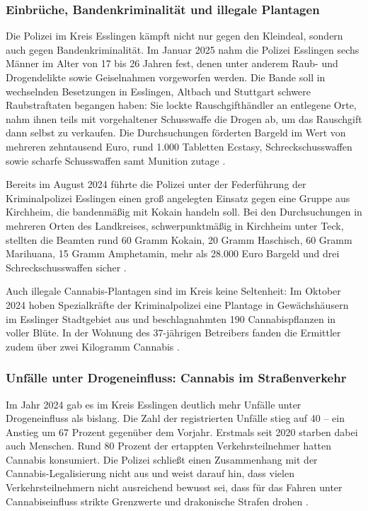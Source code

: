 \documentclass[11pt,a4paper]{article}
\begin{document}
	\subsubsection{Einbrüche, Bandenkriminalität und illegale Plantagen}
	
	Die Polizei im Kreis Esslingen kämpft nicht nur gegen den Kleindeal, sondern auch gegen Bandenkriminalität. Im Januar 2025 nahm die Polizei Esslingen sechs Männer im Alter von 17 bis 26 Jahren fest, denen unter anderem Raub- und Drogendelikte sowie Geiselnahmen vorgeworfen werden. Die Bande soll in wechselnden Besetzungen in Esslingen, Altbach und Stuttgart schwere Raubstraftaten begangen haben: Sie lockte Rauschgifthändler an entlegene Orte, nahm ihnen teils mit vorgehaltener Schusswaffe die Drogen ab, um das Rauschgift dann selbst zu verkaufen. Die Durchsuchungen förderten Bargeld im Wert von mehreren zehntausend Euro, rund 1.000 Tabletten Ecstasy, Schreckschusswaffen sowie scharfe Schusswaffen samt Munition zutage \cite{esslingen-bande}.
	
	Bereits im August 2024 führte die Polizei unter der Federführung der Kriminalpolizei Esslingen einen groß angelegten Einsatz gegen eine Gruppe aus Kirchheim, die bandenmäßig mit Kokain handeln soll. Bei den Durchsuchungen in mehreren Orten des Landkreises, schwerpunktmäßig in Kirchheim unter Teck, stellten die Beamten rund 60 Gramm Kokain, 20 Gramm Haschisch, 60 Gramm Marihuana, 15 Gramm Amphetamin, mehr als 28.000 Euro Bargeld und drei Schreckschusswaffen sicher \cite{esslingen-kokain}.
	
	Auch illegale Cannabis-Plantagen sind im Kreis keine Seltenheit: Im Oktober 2024 hoben Spezialkräfte der Kriminalpolizei eine Plantage in Gewächshäusern im Esslinger Stadtgebiet aus und beschlagnahmten 190 Cannabispflanzen in voller Blüte. In der Wohnung des 37-jährigen Betreibers fanden die Ermittler zudem über zwei Kilogramm Cannabis \cite{esslingen-plantage}.
	
	\subsubsection{Unfälle unter Drogeneinfluss: Cannabis im Straßenverkehr}
	
	Im Jahr 2024 gab es im Kreis Esslingen deutlich mehr Unfälle unter Drogeneinfluss als bislang. Die Zahl der registrierten Unfälle stieg auf 40 – ein Anstieg um 67 Prozent gegenüber dem Vorjahr. Erstmals seit 2020 starben dabei auch Menschen. Rund 80 Prozent der ertappten Verkehrsteilnehmer hatten Cannabis konsumiert. Die Polizei schließt einen Zusammenhang mit der Cannabis-Legalisierung nicht aus und weist darauf hin, dass vielen Verkehrsteilnehmern nicht ausreichend bewusst sei, dass für das Fahren unter Cannabiseinfluss strikte Grenzwerte und drakonische Strafen drohen \cite{esslingen-unfaelle}.
	
\end{document}
